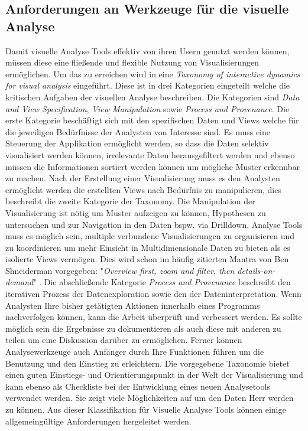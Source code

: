\documentclass[draft=false
              ,paper=a4
              ,twoside=false
              ,fontsize=11pt
              ,headsepline
              ,BCOR10mm
              ,DIV11
              ]{scrbook}
\begin{document}

\subsection{Anforderungen an Werkzeuge für die visuelle Analyse} %
\label{sub:anforderungen_an_werkzeuge}
Damit visuelle Analyse Tools effektiv von ihren Usern genutzt werden können, müssen diese eine fließende und flexible Nutzung von Visualisierungen ermöglichen. Um das zu erreichen wird in \cite{heer_interactive_2012} eine \textit{Taxonomy of interactive dynamics for visual analysis} eingeführt. Diese ist in drei Kategorien eingeteilt welche die kritischen Aufgaben der visuellen Analyse beschreiben. Die Kategorien sind \textit{Data and View Specification}, \textit{View Manipulation} sowie \textit{Process and Provenance}. Die erste Kategorie beschäftigt sich mit den spezifischen Daten und Views welche für die jeweiligen Bedürfnisse der Analysten von Interesse sind. Es muss eine Steuerung der Applikation ermöglicht werden, so dass die Daten selektiv visualisiert werden können, irrelevante Daten herausgefiltert werden und ebenso müssen die Informationen sortiert werden können um mögliche Muster erkennbar zu machen. Nach der Erstellung einer Visualisierung muss es den Analysten ermöglicht werden die erstellten Views nach Bedürfnis zu manipulieren, dies beschreibt die zweite Kategorie der Taxonomy. Die Manipulation der Visualisierung ist nötig um Muster aufzeigen zu können, Hypothesen zu untersuchen und zur Navigation in den Daten bspw. via Drilldown. Analyse Tools muss es möglich sein, multiple verbundene Visualisierungen zu organisieren und zu koordinieren um mehr Einsicht in Multidimensionale Daten zu bieten als es isolierte Views vermögen. Dies wird schon im häufig zitierten Mantra von Ben Shneiderman vorgegeben: "\textit{Overview first, zoom and filter, then details-on-demand}" \cite{shneiderman_the_eyes_1996}. Die abschließende Kategorie \textit{Process and Provenance} beschreibt den iterativen Prozess der Datenexploration sowie den der Dateninterpretation. Wenn Analysten Ihre bisher getätigten Aktionen innerhalb eines Programms nachverfolgen können, kann die Arbeit überprüft und verbessert werden. Es sollte möglich sein die Ergebnisse zu dokumentieren als auch diese mit anderen zu teilen um eine Diskussion darüber zu ermöglichen. Ferner können Analysewerkzeuge auch Anfänger durch Ihre Funktionen führen um die Benutzung und den Einstieg zu erleichtern.
Die vorgegebene Taxonomie bietet einen guten Einstiegs- und Orientierungspunkt in der Welt der Visualisierung und kann ebenso als Checkliste bei der Entwicklung eines neuen Analysetools verwendet werden. Sie zeigt viele Möglichkeiten auf um den Daten Herr werden zu können. Aus dieser Klassifikation für Visuelle Analyse Tools können einige allgemeingültige Anforderungen hergeleitet werden.
\end{document}
